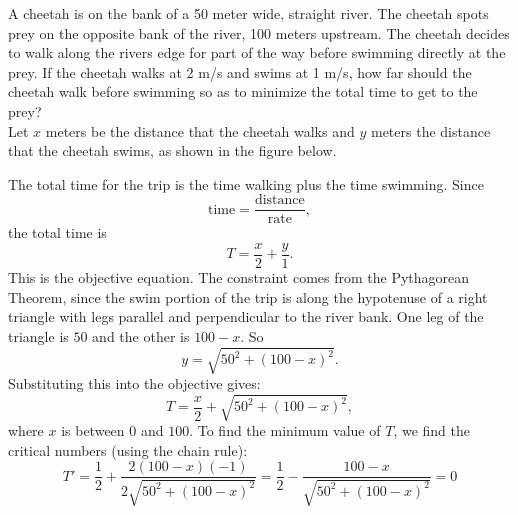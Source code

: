\documentclass{ximera}
\begin{document}
\begin{example}[example 5]
A cheetah is on the bank of a 50 meter wide, straight river.   The cheetah spots prey on the opposite bank of the river, 100 meters upstream. 
The cheetah decides to walk along the rivers edge for part of the way before swimming directly at the prey. If the cheetah walks at 2 m/s and swims at 1 m/s,
how far should the cheetah walk before swimming so as to minimize the total time to get to the prey?\\

Let $x$ meters be the distance that the cheetah walks and $y$ meters the distance that the cheetah swims, as shown in the figure below. 


\begin{image}
\end{image}

The total time for the trip is the time walking plus the time swimming. Since 
\[
\text{time} = \frac{\text{distance}}{\text{rate}},
\]
the total time is 
\[
T = \frac{x}{2} + \frac{y}{1}.
\]
This is the objective equation.
The constraint comes from the Pythagorean Theorem, since the swim portion of the trip is along the hypotenuse of a right triangle 
with legs parallel and perpendicular to the river bank. One leg of the triangle is $50$ and the other is $100-x$.  So 
\[
y = \sqrt{50^2 + (100-x)^2}.
\]
Substituting this into the objective gives:
\[
T = \frac{x}{2} + \sqrt{50^2 + (100-x)^2},\]
where $x$ is between $0$ and $100$.
To find the minimum value of $T$, we find the critical numbers (using the chain rule):
\[
T' = \frac12 +  \frac{2(100-x)(-1)}{2\sqrt{50^2 + (100-x)^2}} = \frac12 - \frac{100-x}{\sqrt{50^2 + (100-x)^2}} = 0
\]


\end{example}
\end{document}
